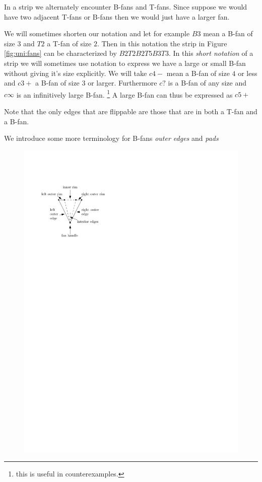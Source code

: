 In a strip we alternately encounter B-fans and T-fans. Since suppose we would have two adjacent T-fans or B-fans then we would just have a larger fan.

We will sometimes shorten our notation and let for example $B3$ mean a B-fan of size $3$ and $T2$ a T-fan of size $2$. Then in this notation the strip in Figure \ref{fig:uni:fans} can be characterized by $B2 T2 B2 T5 B3 T3$. In this \emph{short notation} of a strip we will sometimes use notation to express we have a large  or small B-fan without giving it's size explicitly.
 We will take $c4-$ mean a B-fan of size $4$ or less and $c3+$ a B-fan of size $3$ or larger.  Furthermore $c?$ is a B-fan of any size and $c\infty$ is an infinitively large B-fan.
\footnote{this is useful in counterexamples.} A large B-fan can thus be expressed as $c5+$

Note that the only edges that are flippable are those that are in both a T-fan and a B-fan.


We introduce some more terminology for B-fans \emph{outer edges} and \emph{pads}
\begin{figure}[h]
  \centering
  \includegraphics[scale=1]{unifiedAlgo/img/fanterms}
  \caption{}
  \label{fig:}
\end{figure}


